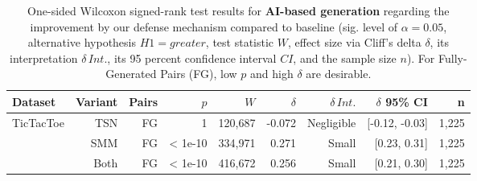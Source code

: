 \begin{table}[h]
\centering
\small
\begin{tabular}{lrrrrrrrr}
  \toprule
Dataset & Variant & Pairs & $p$ & $W$ & $\delta$ & $\delta\,Int.$ & $\delta$ 95\% CI & n \\ 
  \midrule
   \multirow{3}{*}{{TicTacToe}} & TSN & FG & 1 & 120,687 & -0.072 & Negligible & [-0.12, -0.03] & 1,225 \\ 
    & SMM & FG & < 1e-10 & 334,971 & 0.271 & Small & [0.23, 0.31] & 1,225 \\ 
    & Both & FG & < 1e-10 & 416,672 & 0.256 & Small & [0.21, 0.30] & 1,225 \\ 
   \bottomrule
\end{tabular}
\caption[Statistical Tests: AI-based Generation]{One-sided Wilcoxon signed-rank test results for \textbf{AI-based generation} regarding the improvement by our defense mechanism compared to baseline (sig. level of $\alpha=0.05$, alternative hypothesis $H1=greater$, test statistic $W$, effect size via Cliff's delta $\delta$, its interpretation $\delta\,Int.$, its 95 percent confidence interval $CI$, and the sample size $n$). For Fully-Generated Pairs (FG), low $p$ and high $\delta$ are desirable.} 
\label{tab:to-base-gpt-gen}
\end{table}
